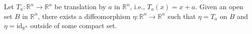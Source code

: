 Let $T_a: \mathbb{R}^n \to \mathbb{R}^n$ be translation by $a$ in $\mathbb{R}^n$, i.e., $T_a(x) = x + a$. Given an open set $B$ in $\mathbb{R}^n$, there exists a diffeomorphism $\eta: \mathbb{R}^n \to \mathbb{R}^n$ such that $\eta = T_a$ on $B$ and $\eta = \mathrm{id}_{\mathbb{R}^n}$ outside of some compact set.

